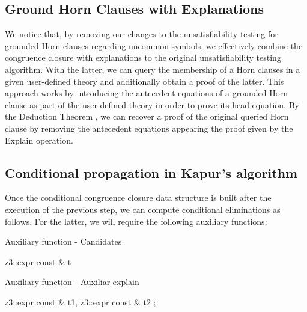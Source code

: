 \subsection{Ground Horn Clauses with Explanations}

We notice that, by removing our changes to the unsatisfiability testing
for grounded Horn clauses regarding uncommon symbols, we effectively combine
the congruence closure with explanations to the original unsatisfiability
testing algorithm. With the latter, we can query the membership of a Horn
clauses in a given user-defined theory and additionally obtain a proof of
the latter. This approach works by introducing the antecedent equations of
a grounded Horn clause as part of the user-defined theory in order to prove
its head equation. By the Deduction Theorem \cite{10.5555/1642730}, we can
recover a proof of the original queried Horn clause by removing the antecedent
equations appearing the proof given by the Explain operation.

\subsection{Conditional propagation in Kapur's algorithm}

Once the conditional congruence closure data structure is built after 
the execution of the previous step, we can compute conditional eliminations
as follows. For the latter, we will require the following auxiliary functions:

\begin{algorithm}[!ht]
  \caption{Auxiliary function - Candidates}
  \linespread{\separationline}\selectfont
  \begin{algorithmic}[2]
     {z3::expr const \& t}
    \Else
    \EndIf
    \EndProcedure
  \end{algorithmic}
\end{algorithm}

\begin{algorithm}[!ht]
  \caption{Auxiliary function - Auxiliar explain}
  \linespread{\separationline}\selectfont
  \begin{algorithmic}[2]
     {z3::expr const \& t1, z3::expr const \& t2}
    \EndIf
    \Else
    ;
    \EndIf
    \Else
    \EndFor
    \EndIf
    \EndIf
    \EndFor
    \EndProcedure
  \end{algorithmic}
\end{algorithm}

